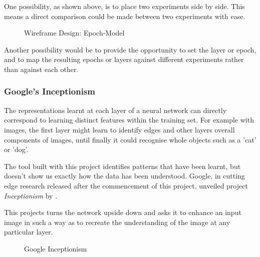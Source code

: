\documentclass[a4paper,11pt,titlepage]{article}
\begin{document}
	One possibility, as shown above, is to place two experiments side by side. This means a direct comparison could be made between two experiments with ease.
	
	\begin{figure}[H]
    			\caption{Wireframe Design: Epoch-Model}%
	\end{figure}	
	
	Another possibility would be to provide the opportunity to set the layer or epoch, and to map the resulting epochs or layers against different experiments rather than against each other.	
	
\subsubsection{Google's Inceptionism}
	The representations learnt at each layer of a neural network can directly correspond to learning distinct features within the training set. For example with images, the first layer might learn to identify edges and other layers overall components of images, until finally it could recognise whole objects such as a 'cat' or 'dog'. 
	\par 
	The tool built with this project identifies patterns that have been learnt, but doesn't show us exactly how the data has been understood. Google, in cutting edge research released after the commencement of this project, unveiled project \textit{Inceptionism} by \cite{Mordvintsev2015}.
	\par 
	This projects turns the network upside down and asks it to enhance an input image in such a way as to recreate the understanding of the image at any particular layer.
	
	\begin{figure}[H]
    			\caption{Google Inceptionism}%
	\end{figure}	
	
\end{document}
